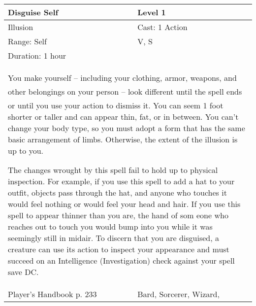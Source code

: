 \documentclass[11pt]{report}
\begin{document}
\begin{table}[H]
	\begin{tabular}{||p{6cm}|p{6cm}||}
		\hline\hline
		\bf{Disguise Self} & Level 1\\ \hline
		Illusion & Cast: 1 Action\\ \hline
		Range: Self & V, S\\ \hline
		Duration: 1 hour & \\ \hline
		\multicolumn{2}{||p{12cm}||}{You make yourself – including your clothing, armor, weapons, and other belongings on your person – look different until the spell ends or until you use your action to dismiss it. 
You can seem  1 foot shorter or taller and can appear thin, fat, or in between. You can’t change your body type, so you must adopt a form that has the same basic arrangement of limbs. Otherwise, the extent of the illusion is up to you. 

The changes wrought by this spell fail to hold up to physical inspection. For example, if you use this spell to add a hat to your outfit, objects pass through the hat, and anyone who touches it would feel nothing or would feel your head and hair. If you use this spell to appear thinner than you are, the hand of som eone who reaches out to touch you would bump into you while it was seemingly still in midair. To discern that you are disguised, a creature can use its action to inspect your appearance and must succeed on an Intelligence (Investigation) check against your spell save DC.}\\ \hline
Player's Handbook p. 233 & Bard, Sorcerer, Wizard, \\ \hline\hline
	\end{tabular}
\end{table}
\end{document}
